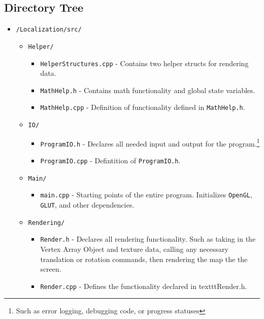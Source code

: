 \documentclass[a4paper,11pt]{article}
\begin{document}
        \subsection{Directory Tree}
        \begin{itemize}
        \item \texttt{/Localization/src/}
            \begin{itemize}
            \item \texttt{Helper/}
                \begin{itemize}
                \item \texttt{HelperStructures.cpp} - Contains two helper structs for rendering data.
                \item \texttt{MathHelp.h} - Contains math functionality and global state variables.
                \item \texttt{MathHelp.cpp} - Definition of functionality defined in \texttt{MathHelp.h}.
                \end{itemize}
            \item \texttt{IO/}
                \begin{itemize}
                \item \texttt{ProgramIO.h} - Declares all needed input and output for the program.\footnote{Such as error logging, debugging code, or progress statuses}
                \item \texttt{ProgramIO.cpp} - Defintition of \texttt{ProgramIO.h}.
                \end{itemize}
            \item \texttt{Main/}
                \begin{itemize}
                \item \texttt{main.cpp} - Starting points of the entire program. Initializes \texttt{OpenGL}, \texttt{GLUT}, and other dependencies.
                \end{itemize}
            \item \texttt{Rendering/}
                \begin{itemize}
                \item \texttt{Render.h} - Declares all rendering functionality. Such as taking in the Vertex Array Object and texture data, calling any necessary translation or rotation commands, then rendering the map the the screen.
                \item \texttt{Render.cpp} - Defines the functionality declared in texttt{Render.h}.
                \end{itemize}

\end{itemize}
\end{itemize}
\end{document}
